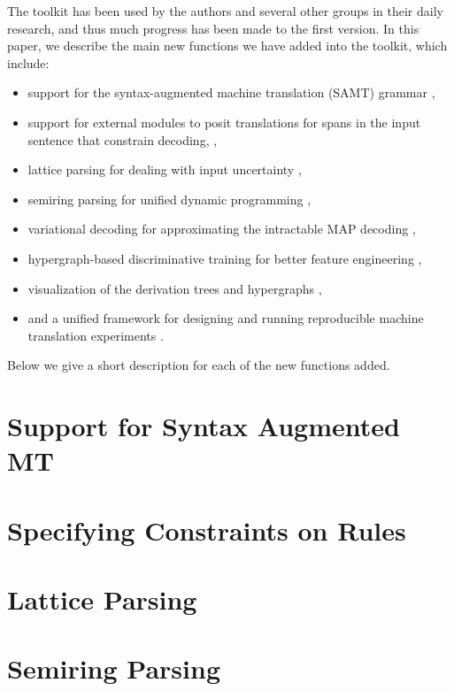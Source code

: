 \documentclass[11pt]{article}
\begin{document}
The toolkit has been used by the authors and several
other groups in their daily research, and thus much progress has
been made to the first version. 
In this paper, we describe the main new functions we have added into the 
toolkit, which include: 
\begin{itemize}
\item
support for the syntax-augmented machine translation (SAMT) grammar \cite{samt2006},
\item
support for external modules to posit translations for spans in the input sentence that constrain decoding,    \cite{PBML-2010-Josua-transliteration},  
\item
lattice parsing for dealing with input uncertainty \cite{dyer-muresan-resnik:2008:ACLMain},
\item
semiring parsing for unified dynamic programming \cite{li-eisner:2009:EMNLP} , 
\item
variational decoding for approximating the intractable MAP decoding \cite{variational-decoding-acl09},
\item
hypergraph-based discriminative training for better feature engineering \cite{zhifei-forest-reranking-galebook}, 
\item
visualization of the derivation trees and hypergraphs \cite{PBML-2010-Josua-visualization}, 
\item
and a unified framework for designing and running reproducible machine translation experiments \cite{Schwartz-wmt10-pipline}.
\end{itemize}
Below we give a short description for each of the new functions added.


\section{Support for Syntax Augmented MT}


\section{Specifying Constraints on Rules}

\section{Lattice Parsing}


\section{Semiring Parsing}
\end{document}
